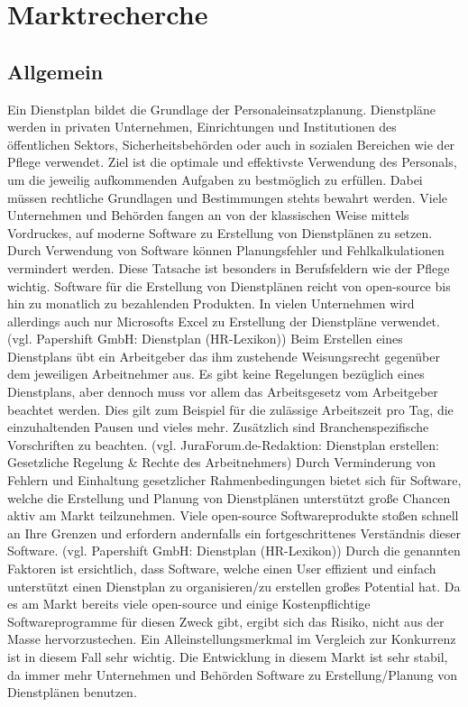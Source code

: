 \documentclass[10pt,a4paper]{article}
\begin{document}
\section{Marktrecherche}
\subsection{Allgemein}
Ein Dienstplan bildet die Grundlage der Personaleinsatzplanung. Dienstpläne werden in privaten Unternehmen, Einrichtungen und Institutionen des öffentlichen Sektors, Sicherheitsbehörden oder auch in sozialen Bereichen wie der Pflege verwendet. Ziel ist die optimale und effektivste Verwendung des Personals, um die jeweilig aufkommenden Aufgaben zu bestmöglich zu erfüllen. Dabei müssen rechtliche Grundlagen und Bestimmungen stehts bewahrt werden. 
Viele Unternehmen und Behörden fangen an von der klassischen Weise mittels Vordruckes, auf moderne Software zu Erstellung von Dienstplänen zu setzen. Durch Verwendung von Software können Planungsfehler und Fehlkalkulationen vermindert werden. Diese Tatsache ist besonders in Berufsfeldern wie der Pflege wichtig. Software für die Erstellung von Dienstplänen reicht von open-source bis hin zu monatlich zu bezahlenden Produkten. In vielen Unternehmen wird allerdings auch nur Microsofts Excel zu Erstellung der Dienstpläne verwendet. (vgl. Papershift GmbH: Dienstplan (HR-Lexikon))
Beim Erstellen eines Dienstplans übt ein Arbeitgeber das ihm zustehende Weisungsrecht gegenüber dem jeweiligen Arbeitnehmer aus. Es gibt keine Regelungen bezüglich eines Dienstplans, aber dennoch muss vor allem das Arbeitsgesetz vom Arbeitgeber beachtet werden. Dies gilt zum Beispiel für die zulässige Arbeitszeit pro Tag, die einzuhaltenden Pausen und vieles mehr. Zusätzlich sind Branchenspezifische Vorschriften zu beachten. (vgl. JuraForum.de-Redaktion: Dienstplan erstellen: Gesetzliche Regelung & Rechte des Arbeitnehmers)
Durch Verminderung von Fehlern und Einhaltung gesetzlicher Rahmenbedingungen bietet sich für Software, welche die Erstellung und Planung von Dienstplänen unterstützt große Chancen aktiv am Markt teilzunehmen. Viele open-source Softwareprodukte stoßen schnell an Ihre Grenzen und erfordern andernfalls ein fortgeschrittenes Verständnis dieser Software. (vgl. Papershift GmbH: Dienstplan (HR-Lexikon))
Durch die genannten Faktoren ist ersichtlich, dass Software, welche einen User effizient und einfach unterstützt einen Dienstplan zu organisieren/zu erstellen großes Potential hat. 
Da es am Markt bereits viele open-source und einige Kostenpflichtige Softwareprogramme für diesen Zweck gibt, ergibt sich das Risiko, nicht aus der Masse hervorzustechen. Ein Alleinstellungsmerkmal im Vergleich zur Konkurrenz ist in diesem Fall sehr wichtig. Die Entwicklung in diesem Markt ist sehr stabil, da immer mehr Unternehmen und Behörden Software zu Erstellung/Planung von Dienstplänen benutzen.
\end{document}
